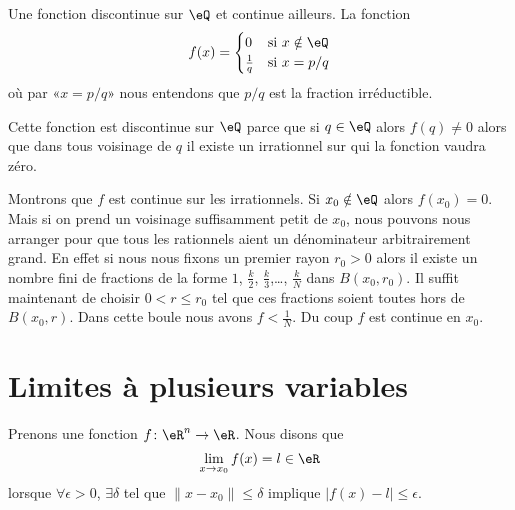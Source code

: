 \begin{example}
    Une fonction discontinue sur \( \eQ\) et continue ailleurs. La fonction 
    \begin{equation}
        f(x)=\begin{cases}
            0    &   \text{si \( x\notin \eQ\)}\\
            \frac{1}{ q }    &    \text{si \( x=p/q\)}
        \end{cases}
    \end{equation}
    où par «\( x=p/q\)» nous entendons que \( p/q\) est la fraction irréductible.

    Cette fonction est discontinue sur \( \eQ\) parce que si \( q\in \eQ\) alors \( f(q)\neq 0\) alors que dans tous voisinage de \( q\) il existe un irrationnel sur qui la fonction vaudra zéro.

    Montrons que \( f\) est continue sur les irrationnels. Si \( x_0\notin \eQ\) alors \( f(x_0)=0\). Mais si on prend un voisinage suffisamment petit de \( x_0\), nous pouvons nous arranger pour que tous les rationnels aient un dénominateur arbitrairement grand. En effet si nous nous fixons un premier rayon \( r_0>0\) alors il existe un nombre fini de fractions de la forme \( 1\), \( \frac{ k }{2}\), \( \frac{ k }{ 3 }\),\ldots, \( \frac{ k }{ N }\) dans \( B(x_0,r_0)\). Il suffit maintenant de choisir \( 0<r\leq r_0\) tel que ces fractions soient toutes hors de \( B(x_0,r)\). Dans cette boule nous avons \( f<\frac{1}{ N }\). Du coup \( f\) est continue en \( x_0\).
\end{example}

\section{Limites à plusieurs variables}
\label{SecLimVarsPlus}

Prenons une fonction $f\colon \eR^n\to \eR$. Nous disons que
\begin{equation}
    \lim_{x\to x_0}f(x)=l\in\eR
\end{equation}
lorsque $\forall \epsilon>0$, $\exists\delta$ tel que $\| x-x_0 \|\leq\delta$ implique $| f(x)-l |\leq \epsilon$. 

